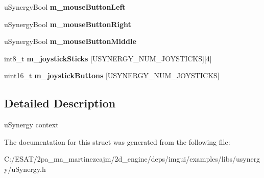 \begin{DoxyCompactItemize}
\mbox{\label{structu_synergy_context_a9abea7703ac0ca4e94640cc828a493ff}} 
u\+Synergy\+Bool {\bfseries m\+\_\+mouse\+Button\+Left}
\item 
\mbox{\label{structu_synergy_context_a0216f6b1c5a9adb08d6f32e027eba920}} 
u\+Synergy\+Bool {\bfseries m\+\_\+mouse\+Button\+Right}
\item 
\mbox{\label{structu_synergy_context_a9086df4395c9d9f05a9b555d46ab07a6}} 
u\+Synergy\+Bool {\bfseries m\+\_\+mouse\+Button\+Middle}
\item 
\mbox{\label{structu_synergy_context_aade265f118e12a5822da1d4d490d385e}} 
int8\+\_\+t {\bfseries m\+\_\+joystick\+Sticks} \mbox{[}U\+S\+Y\+N\+E\+R\+G\+Y\+\_\+\+N\+U\+M\+\_\+\+J\+O\+Y\+S\+T\+I\+C\+KS\mbox{]}\mbox{[}4\mbox{]}
\item 
\mbox{\label{structu_synergy_context_a7cb69def1311714894cf3a9dc83c6b9b}} 
uint16\+\_\+t {\bfseries m\+\_\+joystick\+Buttons} \mbox{[}U\+S\+Y\+N\+E\+R\+G\+Y\+\_\+\+N\+U\+M\+\_\+\+J\+O\+Y\+S\+T\+I\+C\+KS\mbox{]}
\end{DoxyCompactItemize}


\subsection{Detailed Description}
u\+Synergy context 

The documentation for this struct was generated from the following file\+:\begin{DoxyCompactItemize}
\item 
C\+:/\+E\+S\+A\+T/2pa\+\_\+ma\+\_\+martinezcajm/2d\+\_\+engine/deps/imgui/examples/libs/usynergy/u\+Synergy.\+h\end{DoxyCompactItemize}
